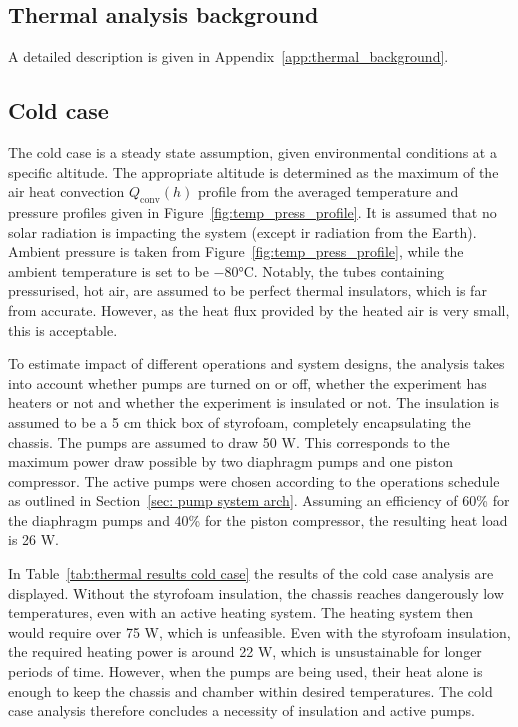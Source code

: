 \documentclass[
  a4paper,
  11pt,
  openany,
  parskip,
  toc=totoc,
  listof=totoc,
  bibliography=totoc
]{scrreprt}
\newcommand{\fref}[1]{Figure~\ref{#1}}
\newcommand{\tref}[1]{Table~\ref{#1}}
\newcommand{\sref}[1]{Section~\ref{#1}}
\newcommand{\aref}[1]{Appendix~\ref{#1}}
\begin{document}
\subsection{Thermal analysis background}
A detailed description is given in \aref{app:thermal_background}.


\subsection{Cold case}\label{sec: thermal cold case}
The cold case is a steady state assumption, given environmental conditions at a specific altitude. The appropriate altitude is determined as the maximum of the air heat convection $Q_\mathrm{conv}(h)$ profile from the averaged temperature and pressure profiles given in \fref{fig:temp_press_profile}. It is assumed that no solar radiation is impacting the system (except \gls{ir} radiation from the Earth). Ambient pressure is taken from \fref{fig:temp_press_profile}, while the ambient temperature is set to be $-80$°C. Notably, the tubes containing pressurised, hot air, are assumed to be perfect thermal insulators, which is far from accurate. However, as the heat flux provided by the heated air is very small, this is acceptable.\par 
To estimate impact of different operations and system designs, the analysis takes into account whether pumps are turned on or off, whether the experiment has heaters or not and whether the experiment is insulated or not. The insulation is assumed to be a 5 cm thick box of styrofoam, completely encapsulating the chassis. The pumps are assumed to draw 50 W. This corresponds to the maximum power draw possible by two diaphragm pumps and one piston compressor. The active pumps were chosen according to the operations schedule as outlined in \sref{sec: pump system arch}. Assuming an efficiency of 60\% for the diaphragm pumps and 40\% for the piston compressor, the resulting heat load is 26 W.\par 

In \tref{tab:thermal results cold case} the results of the cold case analysis are displayed. 
Without the styrofoam insulation, the chassis reaches dangerously low temperatures, even with an active heating system. The heating system then would require over 75 W, which is unfeasible. Even with the styrofoam insulation, the required heating power is around 22 W, which is unsustainable for longer periods of time. However, when the pumps are being used, their heat alone is enough to keep the chassis and chamber within desired temperatures. The cold case analysis therefore concludes a necessity of insulation and active pumps.
\end{document}
